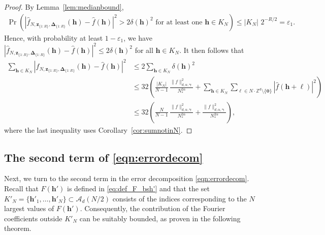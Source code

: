 \documentclass[a4paper,11pt]{article}
\newcommand{\bszero}{\boldsymbol{0}}
\newcommand{\bsh}{\boldsymbol{h}}
\newcommand{\bsl}{\boldsymbol{\ell}}
\newcommand{\bsz}{\boldsymbol{z}}
\newcommand{\bsgamma}{\boldsymbol{\gamma}}
\newcommand{\bsDelta}{\boldsymbol{\Delta}}
\newcommand{\ZZ}{\mathbb{Z}}
\newcommand{\Acal}{\mathcal{A}}
\begin{document}
\begin{proof}
    By Lemma~\ref{lem:medianbound}, 
    \begin{align*}
    \Pr\left(\left|\widehat{f}_{N,\bsz_{\{1{:}R\}},\bsDelta_{\{1{:}R\}}}(\bsh)-\widehat{f}(\bsh)\right|^2> 2\delta(\bsh)^2 \text{ for at least one }  \bsh\in K_N\right)
    \le |K_N| \, \,  2^{-R/2}
    = \varepsilon_1.
    \end{align*}
    Hence, with probability at least $1-\varepsilon_1$, we have $\left|\widehat{f}_{N,\bsz_{\{1{:}R\}},\bsDelta_{\{1{:}R\}}}(\bsh)-\widehat{f}(\bsh)\right|^2\leq 2\delta(\bsh)^2$ for all $\bsh\in K_N$. It then follows that
    \begin{align*}
        \sum_{\bsh\in K_N}\left|\widehat{f}_{N,\bsz_{\{1{:}R\}},\bsDelta_{\{1{:}R\}}}(\bsh)-\widehat{f}(\bsh)\right|^2
        & \le 2\sum_{\bsh\in K_N}\delta(\bsh)^2\\
        & \le 32\left(\frac{|K_N|}{N-1}\,\frac{\|f\|^2_{d,\alpha,\bsgamma}}{N_*^{2\alpha}}+\sum_{\bsh\in K_N}\sum_{\bsl \in N\cdot \ZZ^d\setminus \{\bszero\} }|\widehat{f}(\bsh+\bsl)|^2\right)\\
        & \le 32\left(\frac{N}{N-1}\,\frac{\|f\|^2_{d,\alpha,\bsgamma}}{N_*^{2\alpha}}+\frac{\|f\|^2_{d,\alpha,\bsgamma}}{N_*^{2\alpha}}\right),
    \end{align*}
    where the last inequality uses Corollary~\ref{cor:sumnotinN}.
\end{proof}


\subsection{The second term of \eqref{eqn:errordecom}}

Next, we turn to the second term in the error decomposition \eqref{eqn:errordecom}. Recall that $F(\bsh')$ is defined in \eqref{eq:def_F_bsh'} and that the set $K'_N=\{\bsh'_1,\dots,\bsh'_N\}\subset \Acal_d(N/2)$ consists of the indices corresponding to the $N$ largest values of $F(\bsh')$. Consequently, the contribution of the Fourier coefficients outside $K'_N$ can be suitably bounded, as proven in the following theorem.
\end{document}
